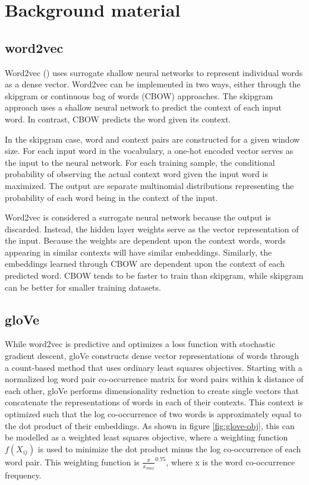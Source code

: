 \section{\label{sec:level3} Background material}

\subsection{word2vec}

Word2vec (\cite{word2vec}) uses surrogate shallow neural networks to represent individual words as a dense vector. Word2vec can be implemented in two ways, either through the skipgram or continuous bag of words (CBOW) approaches. The skipgram approach uses a shallow neural network to predict the context of each input word. In contrast, CBOW predicts the word given its context. 

In the skipgram case, word and context pairs are constructed for a given window size. For each input word in the vocabulary, a one-hot encoded vector serves as the input to the neural network. For each training sample, the conditional probability of observing the actual context word given the input word is maximized. The output are separate multinomial distributions representing the probability of each word being in the context of the input.

Word2vec is considered a surrogate neural network because the output is discarded. Instead, the hidden layer weights serve as the vector representation of the input. Because the weights are dependent upon the context words, words appearing in similar contexts will have similar embeddings. Similarly, the embeddings learned through CBOW are dependent upon the context of each predicted word. CBOW tends to be faster to train than skipgram, while skipgram can be better for smaller training datasets.

\subsection{gloVe}

While word2vec is predictive and optimizes a loss function with stochastic gradient descent, gloVe constructs dense vector representations of words through a count-based method that uses ordinary least squares objectives. Starting with a normalized log word pair co-occurrence matrix for word pairs within k distance of each other, gloVe performs dimensionality reduction to create single vectors that concatenate the representations of words in each of their contexts. This context is optimized such that the log co-occurrence of two words is approximately equal to the dot product of their embeddings. As shown in figure \ref{fig:glove-obj}, this can be modelled as a weighted least squares objective, where a weighting function $f(X_{ij})$ is used to minimize the dot product minus the log co-occurrence of each word pair. This weighting function is $\frac{x}{x_{max}}^{0.75}$, where x is the word co-occurrence frequency. 

